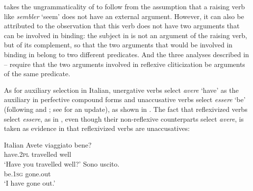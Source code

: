 \documentclass[output=paper,hidelinks]{langscibook}
\begin{document}
\ea\label{ex:Romance:28}
\z\z
\citet{Grimshaw90} takes the ungrammaticality of  to follow from the assumption that a raising verb like \textit{sembler} `seem' does not have an external argument. However, it can also be attributed to the observation that this verb does not have two arguments that can be involved in binding: the subject in  is not an argument of the raising verb, but of its complement, so that the two arguments that would be involved in binding in  belong to two different predicates. And the three analyses described in -- require that the two arguments involved in reflexive cliticization be arguments of the same predicate.

As for auxiliary selection in Italian, unergative verbs select \textit{avere} `have' as the auxiliary in perfective compound forms and unaccusative verbs select \textit{essere} `be' (following \citealt{Perlmutter1978,Perlmutter1983,Perlmutter1989} and \citealt{Rosen1984}; see \citealt{Loporcaro2016} for an update), as shown in . The fact that reflexivized verbs select \textit{essere}, as in , even though their non-reflexive counterparts select \textit{avere}, is taken as evidence in \citet{Grimshaw90} that reflexivized verbs are unaccusatives:

\ea\label{ex:Romance:29}  Italian \citep{Katerinov1975}
\ea\label{ex:Romance:29a}
\gll
Avete viaggiato bene?\\
have.\textsc{2pl} travelled well\\
\glt   `Have you travelled well?'
\ex\label{ex:Romance:29b}
\gll Sono uscito.\\
 be.\textsc{1sg} gone.out\\
\glt   `I have gone out.'
 \z\z
\end{document}

